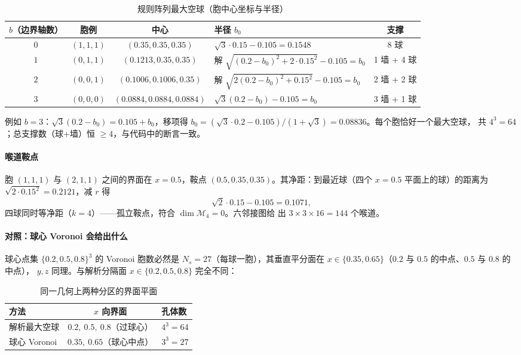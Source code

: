 \documentclass[UTF8,zihao=-4]{ctexart}
\begin{document}
\begin{table}[htbp]
\centering
\caption{规则阵列最大空球（胞中心坐标与半径）}
\label{tab:reg-balls}
\small
\begin{tabularx}{\textwidth}{cccXc}
\toprule
$b$（边界轴数） & 胞例 & 中心 & 半径 $b_0$ & 支撑\\
\midrule
$0$ & $(1,1,1)$ & $(0.35,0.35,0.35)$ & $\sqrt3\cdot0.15-0.105=0.1548$ & 8 球\\
$1$ & $(0,1,1)$ & $(0.1213,0.35,0.35)$ & 解 $\sqrt{(0.2-b_0)^2+2\cdot0.15^2}-0.105=b_0$ & 1 墙 + 4 球\\
$2$ & $(0,0,1)$ & $(0.1006,0.1006,0.35)$ & 解 $\sqrt{2(0.2-b_0)^2+0.15^2}-0.105=b_0$ & 2 墙 + 2 球\\
$3$ & $(0,0,0)$ & $(0.0884,0.0884,0.0884)$ & $\sqrt3(0.2-b_0)-0.105=b_0$ & 3 墙 + 1 球\\
\bottomrule
\end{tabularx}
\end{table}

例如 $b=3$：$\sqrt3(0.2-b_0)=0.105+b_0$，移项得
$b_0=(\sqrt3\cdot0.2-0.105)/(1+\sqrt3)=0.08836$。每个胞恰好一个最大空球，
共 $4^3=64$；总支撑数（球+墙）恒 $\ge4$，与代码中的断言一致。

\paragraph{喉道鞍点} 胞 $(1,1,1)$ 与 $(2,1,1)$ 之间的界面在 $x=0.5$，鞍点
$(0.5,0.35,0.35)$。其净距：到最近球（四个 $x=0.5$ 平面上的球）的距离为
$\sqrt{2\cdot0.15^2}=0.2121$，减 $r$ 得
\begin{equation}
  \sqrt2\cdot0.15-0.105=0.1071,
\end{equation}
四球同时等净距（$k=4$）——孤立鞍点，符合 $\dim\mathcal M_4=0$。六邻接图给
出 $3\times3\times16=144$ 个喉道。

\paragraph{对照：球心 Voronoi 会给出什么} 球心点集 $\{0.2,0.5,0.8\}^3$ 的
Voronoi 胞数必然是 $N_s=27$（每球一胞），其垂直平分面在
$x\in\{0.35,0.65\}$（$0.2$ 与 $0.5$ 的中点、$0.5$ 与 $0.8$ 的中点），
$y,z$ 同理。与解析分隔面 $x\in\{0.2,0.5,0.8\}$ 完全不同：

\begin{table}[htbp]
\centering
\caption{同一几何上两种分区的界面平面}
\label{tab:reg-vs-vor}
\small
\begin{tabular}{lcl}
\toprule
方法 & $x$ 向界面 & 孔体数\\
\midrule
解析最大空球 & $0.2,\ 0.5,\ 0.8$（过球心） & $4^3=64$\\
球心 Voronoi & $0.35,\ 0.65$（球心中点） & $3^3=27$\\
\bottomrule
\end{tabular}
\end{table}
\end{document}
